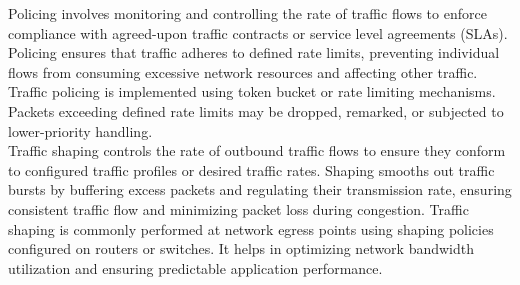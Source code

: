 \documentclass{article}
\begin{document}
	Policing involves monitoring and controlling the rate of traffic flows to enforce compliance with agreed-upon traffic contracts or service level agreements (SLAs). Policing ensures that traffic adheres to defined rate limits, preventing individual flows from consuming excessive network resources and affecting other traffic. Traffic policing is implemented using token bucket or rate limiting mechanisms. Packets exceeding defined rate limits may be dropped, remarked, or subjected to lower-priority handling.\\
	
	Traffic shaping controls the rate of outbound traffic flows to ensure they conform to configured traffic profiles or desired traffic rates. Shaping smooths out traffic bursts by buffering excess packets and regulating their transmission rate, ensuring consistent traffic flow and minimizing packet loss during congestion. Traffic shaping is commonly performed at network egress points using shaping policies configured on routers or switches. It helps in optimizing network bandwidth utilization and ensuring predictable application performance.\\
	
\end{document}
